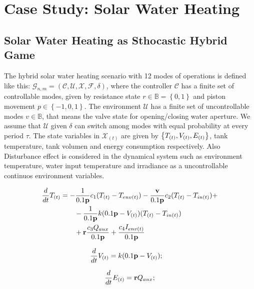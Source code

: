\documentclass[conference]{IEEEtran}
\begin{document}
\section{Case Study: Solar Water Heating}


\subsection{Solar Water Heating as Sthocastic Hybrid Game}

The hybrid solar water heating scenario with 12 modes of operations is
defined  like this: $\mathcal{G}_{n,m} = (\mathcal{C,U,X,F},\delta)$, 
where the controller $\mathcal{C}$ has a finite set of controllable modes,
given by resistance state ${r \in \mathbb{B} = \left\lbrace 0,1 \right\rbrace }$ 
and piston movement $p \in \left\lbrace-1,0,1\right\rbrace $. 
The environment $\mathcal{U}$ has a finite set of uncontrollable modes
 $v \in \mathbb{B} $, that means the valve state for opening/closing
water aperture. We assume that $\mathcal{U}$ given $\delta$ can switch
among modes with equal probability at every period $\tau$. The state variables
in $\mathcal{X}_{(t)}$ are given by $\left\lbrace T_{(t)},V_{(t)},E_{(t)} \right\rbrace $, 
tank temperature, tank volumen and energy consumption respectively. Also 
Disturbance effect is considered in the dynamical system such as environment
temperature, water input temperature and irradiance as a uncontrollable 
continuos environment variables.


\begin{align}
    \frac{d}{dt}\tcont &=   -\frac{1}{0.1\textbf{p}}  \constone(\tcont-\tenv) 
    - \frac{ \textbf{v} }{0.1\textbf{p}}\consttwo (\tcont-\tin) + \notag\\ &\qquad
    - \frac{ 1 }{0.1\textbf{p}} k( 0.1\textbf{p} - \vcont ) (\tcont-\tin)  \notag\\ &\qquad
    + \textbf{r} \frac{ \constthree \auxheat  }{0.1\textbf{p}}  + 
    \frac{ \constfour \irradiance}{0.1\textbf{p}} 
\label{temperature-equation}
\end{align}

\begin{equation}
    \frac{d}{dt}\vcont = k( 0.1\textbf{p} - \vcont ); \quad
\label{volume-equation}
\end{equation}

\begin{equation} 
\frac{d}{dt}\energy =  \textbf{r}  \auxheat ;
\label{Energy-equation}
\end{equation}
\end{document}
